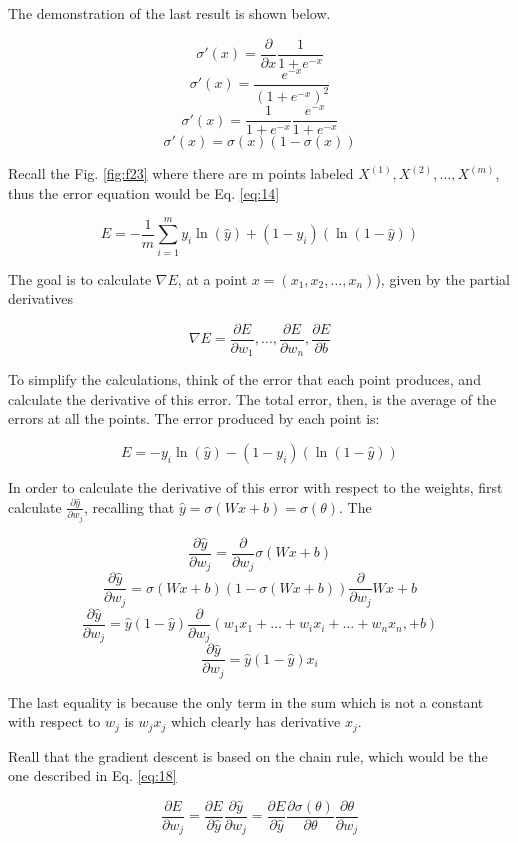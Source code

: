 \documentclass{article}
\begin{document}
The demonstration of the last result is shown below.

\[\sigma'(x) = \frac{\partial}{\partial x} \frac{1}{1 + e ^{-x}}\]
\[\sigma'(x) = \frac{e ^{-x}}{(1 + e ^{-x})^2}\]
\[\sigma'(x) = \frac{1}{1 + e ^{-x}} \frac{e ^{-x}}{1 + e ^{-x}}\]
\[\sigma'(x) = \sigma(x)(1 - \sigma(x)) \]

Recall the Fig. \ref{fig:f23} where there are m points labeled \(X^{(1)}, X^{(2)}, \dots, X^{(m)} \), thus the error equation would be Eq. \eqref{eq:14}

\[E = - \frac{1}{m} \sum_{i=1}^m y_i\ln{(\hat{y})} + (1 - y_i) (\ln{(1 - \hat{y})})\]

The goal is to calculate \(\nabla E\), at a point \(x = (x_1, x_2,\dots,x_n)\)), given by the partial derivatives

\[\nabla E = \frac{\partial E}{\partial w_1}, \dots, \frac{\partial E}{\partial w_n}, \frac{\partial E}{\partial b}\]

To simplify the calculations, think of the error that each point produces, and calculate the derivative of this error. The total error, then, is the average of the errors at all the points. The error produced by each point is:

\[ E = -y_i\ln{(\hat{y})} - (1 - y_i) (\ln{(1 - \hat{y})})\]

In order to calculate the derivative of this error with respect to the weights, first calculate \(\frac{\partial \hat{y}}{\partial w_j}\), recalling that \(\hat{y} = \sigma(Wx + b) = \sigma(\theta)\). The 

\[\frac{\partial \hat{y}}{\partial w_j} = \frac{\partial}{\partial w_j} \sigma(Wx + b) \]
\[\frac{\partial \hat{y}}{\partial w_j} = \sigma(Wx + b)(1 - \sigma(Wx + b)) \frac{\partial}{\partial w_j}Wx + b \]
\[\frac{\partial \hat{y}}{\partial w_j} = \hat{y}(1 - \hat{y}) \frac{\partial}{\partial w_j}(w_1x_1+\dots+w_ix_i+\dots+w_nx_n, + b) \]
\[\frac{\partial \hat{y}}{\partial w_j} = \hat{y}(1 - \hat{y}) x_i \]

The last equality is because the only term in the sum which is not a constant with respect to \(w_j\) is \( w_jx_j\) which clearly has derivative \(x_j\).

Reall that the gradient descent is based on the chain rule, which would be the one described in Eq. \eqref{eq:18}

\begin{equation}
\label{eq:18}
\frac{\partial E}{\partial w_j} = \frac{\partial E}{\partial \hat{y}} \frac{\partial \hat{y}}{\partial w_j} =  \frac{\partial E}{\partial \hat{y}} \frac{\partial \sigma(\theta)}{\partial \theta} \frac{\partial \theta}{\partial w_j}
\end{equation} 
\end{document}
